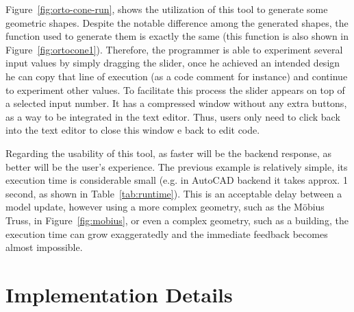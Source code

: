 Figure~\ref{fig:orto-cone-run}, shows the utilization of this tool to generate some geometric shapes. Despite the notable difference among the generated shapes, the function used to generate them is exactly the same (this function is also shown in Figure~\ref{fig:ortocone1}). Therefore, the programmer is able to experiment several input values by simply dragging the slider, once he achieved an intended design he can copy that line of execution (as a code comment for instance) and continue to experiment other values. To facilitate this process the slider appears on top of a selected input number. It has a compressed window without any extra buttons, as a way to be integrated in the text editor. Thus, users only need to click back into the text editor to close this window e back to edit code.

Regarding the usability of this tool, as faster will be the backend response, as better will be the user's experience. The previous example is relatively simple, its execution time is considerable small (e.g. in AutoCAD backend it takes approx. 1  second, as shown in Table~\ref{tab:runtime}). This is an acceptable delay between a model update, however using a more complex geometry, such as the Möbius Truss, in Figure~\ref{fig:mobius}, or even a complex geometry, such as a building, the execution time can grow exaggeratedly and the immediate feedback becomes almost impossible. 



\section{Implementation Details}

